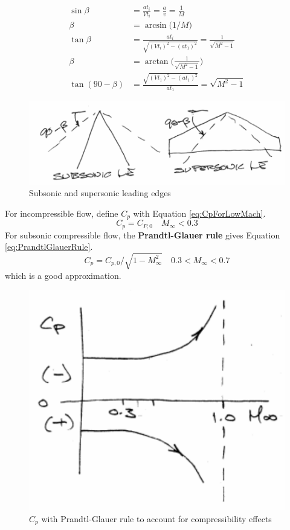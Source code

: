 \documentclass[draft=false, titlepage]{article}
\begin{document}
\begin{align*}
\sin\beta &= \frac{a t_i}{Vt_i} = \frac{a}{v} = \frac{1}{M}\\
\beta &= \arcsin\big(1/M\big)\\
\tan\beta &= \frac{at_i}{\sqrt{(Vt_i)^2 - (at_1)^2}} = \frac{1}{\sqrt{M^2-1}}\\
\beta &= \arctan\big(\frac{1}{\sqrt{M^2-1}}\big)\\
\tan(90-\beta)&= \frac{\sqrt{(Vt_1)^2-(at_1)^2}}{at_1} = \sqrt{M^2-1}
\end{align*}
\begin{figure}[ht]
	\centering
	\includegraphics[width=0.7\linewidth]{Figures/p46_leadingEdge.PNG}
	\caption{Subsonic and supersonic leading edges}
	\label{fig:p46_leadingEdge}
\end{figure}

For incompressible flow, define $C_p$ with Equation \ref{eq:CpForLowMach}.
\begin{equation}
C_p = C_{P,0} \quad M_\infty < 0.3
\label{eq:CpForLowMach}
\end{equation}
For subsonic compressible flow, the \textbf{Prandtl-Glauer rule} gives Equation \ref{eq:PrandtlGlauerRule}.
\begin{equation}
\boxed{C_p = C_{p,0}/\sqrt{1-M_\infty^2}} \quad 0.3 < M_\infty < 0.7
\label{eq:PrandtlGlauerRule}
\end{equation}
which is a good approximation.
\begin{figure}[ht]
	\centering
	\includegraphics[width=0.4\linewidth]{Figures/p47_supersonicCp.PNG}
	\caption{$C_p$ with Prandtl-Glauer rule to account for compressibility effects}
	\label{fig:p47_supersonicCp}
\end{figure}
\end{document}
